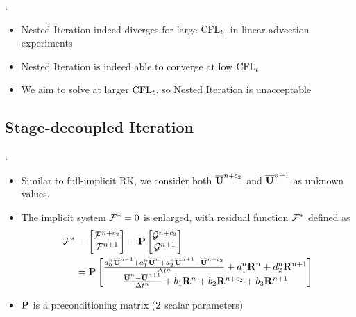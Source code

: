 \documentclass[aspectratio=169,serif]{beamer} %
\begin{document}
\begin{frame}{\secname: \subsecname}
  \begin{itemize}
    \item Nested Iteration indeed diverges for large $\text{CFL}_t$, in linear advection experiments
    \item Nested Iteration is indeed able to converge at low $\text{CFL}_t$
    \item We aim to solve at larger $\text{CFL}_t$, so Nested Iteration is unacceptable
  \end{itemize}
\end{frame}

\subsection{Stage-decoupled Iteration}

\begin{frame}{\secname: \subsecname}
  \begin{itemize}
    \item Similar to full-implicit RK, we consider both $\overline{\mathbf{U}}^{n+c_2}$ and
          $\overline{\mathbf{U}}^{n+1}$ as unknown values.
    \item The implicit system $\mathcal{F}^*=0$ is enlarged, with residual function $\mathcal{F}^*$ defined as
          \begin{equation}
            \begin{aligned}
              \mathcal{F}^* & =\begin{bmatrix}
                \mathcal{F}^{n+c_2} \\
                \mathcal{F}^{n+1}
              \end{bmatrix} = \mathbf{P}\begin{bmatrix}
                \mathcal{G}^{n+c_2} \\
                \mathcal{G}^{n+1}
              \end{bmatrix} \\ & = \mathbf{P}\begin{bmatrix}
                \frac{a^n_0\overline{\mathbf{U}}^{n - 1} +
                  a^n_1\overline{\mathbf{U}}^{n} +
                  a^n_2\overline{\mathbf{U}}^{n + 1} - \overline{\mathbf{U}}^{n+c_2}}{{\Delta} t^n}
                +
                d^n_1\mathbf{R}^{n} +
                d^n_2\mathbf{R}^{n + 1}
                \\
                \frac{\overline{\mathbf{U}}^{n} - \overline{\mathbf{U}}^{n+1}}{{\Delta} t^n}  +
                b_1 \mathbf{R}^n +
                b_2 \mathbf{R}^{n+c_2} +
                b_3 \mathbf{R}^{n+1}
              \end{bmatrix}
              \label{eq:DITRFFDef}
            \end{aligned}
          \end{equation}
    \item $\mathbf{P}$ is a preconditioning matrix ($2\time 2$ scalar parameters)
  \end{itemize}
\end{frame}
\end{document}
